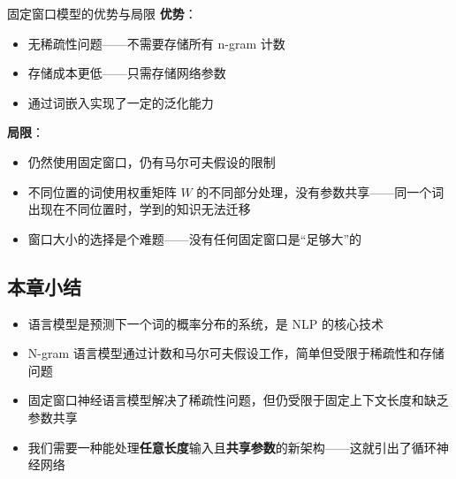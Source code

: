 \begin{importantbox}{固定窗口模型的优势与局限}
\textbf{优势}：
\begin{itemize}
    \item 无稀疏性问题——不需要存储所有 n-gram 计数
    \item 存储成本更低——只需存储网络参数
    \item 通过词嵌入实现了一定的泛化能力
\end{itemize}
\textbf{局限}：
\begin{itemize}
    \item 仍然使用固定窗口，仍有马尔可夫假设的限制
    \item 不同位置的词使用权重矩阵 $W$ 的不同部分处理，没有参数共享——同一个词出现在不同位置时，学到的知识无法迁移
    \item 窗口大小的选择是个难题——没有任何固定窗口是``足够大''的
\end{itemize}
\end{importantbox}

\subsection{本章小结}

\begin{itemize}
    \item 语言模型是预测下一个词的概率分布的系统，是 NLP 的核心技术
    \item N-gram 语言模型通过计数和马尔可夫假设工作，简单但受限于稀疏性和存储问题
    \item 固定窗口神经语言模型解决了稀疏性问题，但仍受限于固定上下文长度和缺乏参数共享
    \item 我们需要一种能处理\textbf{任意长度}输入且\textbf{共享参数}的新架构——这就引出了循环神经网络
\end{itemize}


